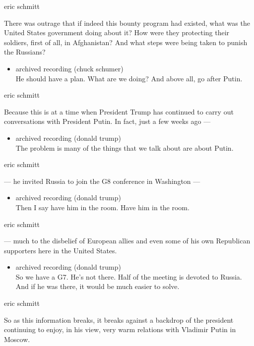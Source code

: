 eric schmitt

There was outrage that if indeed this bounty program had existed, what
was the United States government doing about it? How were they
protecting their soldiers, first of all, in Afghanistan? And what steps
were being taken to punish the Russians?

\begin{itemize}
\tightlist
\item
  archived recording (chuck schumer)\\
  He should have a plan. What are we doing? And above all, go after
  Putin.
\end{itemize}

eric schmitt

Because this is at a time when President Trump has continued to carry
out conversations with President Putin. In fact, just a few weeks ago
---

\begin{itemize}
\tightlist
\item
  archived recording (donald trump)\\
  The problem is many of the things that we talk about are about Putin.
\end{itemize}

eric schmitt

--- he invited Russia to join the G8 conference in Washington ---

\begin{itemize}
\tightlist
\item
  archived recording (donald trump)\\
  Then I say have him in the room. Have him in the room.
\end{itemize}

eric schmitt

--- much to the disbelief of European allies and even some of his own
Republican supporters here in the United States.

\begin{itemize}
\tightlist
\item
  archived recording (donald trump)\\
  So we have a G7. He's not there. Half of the meeting is devoted to
  Russia. And if he was there, it would be much easier to solve.
\end{itemize}

eric schmitt

So as this information breaks, it breaks against a backdrop of the
president continuing to enjoy, in his view, very warm relations with
Vladimir Putin in Moscow.

